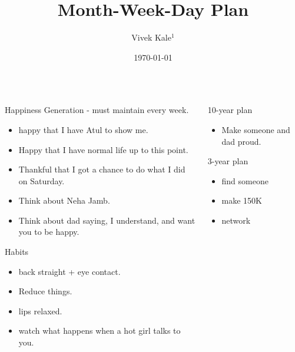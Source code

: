 \documentclass[serif, mathserif, final]{beamer}
\title{Month-Week-Day Plan}
\author{Vivek Kale$^1$}
\institute{$^1$ University of Illinois at Urbana-Champaign}
\date{\today}
\begin{document}
  

\begin{frame}{} 
  \begin{columns}
    \begin{column}{0.22\linewidth}
      \begin{block}{Happiness Generation - must maintain every week.} 
        \begin{itemize}
          \tiny \item \tiny happy that I have Atul to show me.  
        \item \tiny Happy that I have normal life up to this point.  
        \item \tiny Thankful that I got a chance to do what I did on Saturday. 
        \item \tiny Think about Neha Jamb. 
        \item \tiny Think about dad saying, I understand, and want you to be happy. 
        \end{itemize}
      \end{block}

    \begin{block}{Habits} 
      \begin{itemize} 
        \tiny \item \tiny back straight + eye contact. 
      \item \tiny Reduce things. 
      \item \tiny lips relaxed. 
      \item \tiny watch what happens when a hot girl talks to you. 
      \end{itemize} 
    \end{block} 
  \end{column} %

  \begin{column}{0.5\linewidth}
    \begin{block}{ 10-year plan }
      \begin{itemize}
      \item \small Make someone and dad proud.
      \end{itemize}
    \end{block}
    
    \begin{block}{ 3-year plan }
      \begin{itemize}
      \item \small find someone
      \item \small make 150K
      \item \small network
      \end{itemize}
    \end{block} 


\end{column}
\end{columns}
\end{frame}
\end{document}
